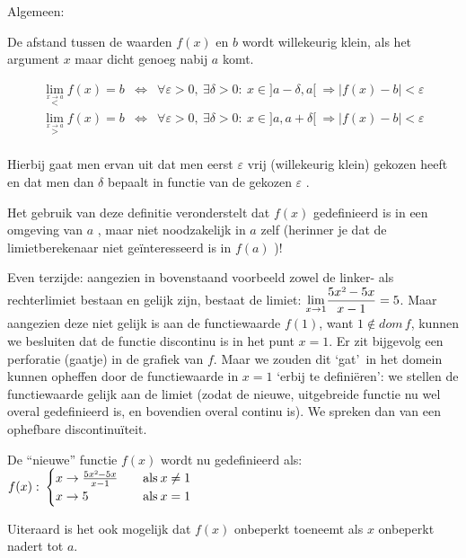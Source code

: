 Algemeen:

De afstand tussen de waarden $f(x)$ en $b$ wordt willekeurig klein,
als het argument $x$ maar dicht genoeg nabij $a$ komt.

\begin{eqnarray*}
{\displaystyle \lim_{\overset{x\rightarrow a}{<}}}f(x)=b & \Leftrightarrow & \forall\varepsilon>0,\:\exists\delta>0:\:x\in]a-\delta,a[\:\Rightarrow\left|f(x)-b\right|<\varepsilon\\
{\displaystyle \lim_{\overset{x\rightarrow a}{>}}}f(x)=b & \Leftrightarrow & \forall\varepsilon>0,\:\exists\delta>0:\:x\in]a,a+\delta[\:\Rightarrow\left|f(x)-b\right|<\varepsilon\\
\end{eqnarray*}

Hierbij gaat men ervan uit dat men eerst $\varepsilon$ vrij (willekeurig
klein) gekozen heeft en dat men dan $\delta$ bepaalt in functie van
de gekozen $\varepsilon$ .

Het gebruik van deze definitie veronderstelt dat $f(x)$ gedefinieerd
is in een omgeving van $a$ , maar niet noodzakelijk in $a$ zelf
(herinner je dat de limietberekenaar niet ge\"interesseerd is in $f(a)$
)! 

Even terzijde: aangezien in bovenstaand voorbeeld zowel
de linker- als rechterlimiet bestaan en gelijk zijn, bestaat de limiet:
${\displaystyle \lim_{x\to1}}{\displaystyle \frac{5x\text{\texttwosuperior}-5x}{x-1}}=5$.
Maar aangezien deze niet gelijk is aan de functiewaarde $f(1)$, want
$1\notin dom\,f$, kunnen we besluiten dat de functie discontinu is
in het punt $x=1$. Er zit bijgevolg een perforatie (gaatje) in de
grafiek van $f$. Maar we zouden dit \textquoteleft gat\textquoteright \ in het domein kunnen opheffen
door de functiewaarde in $x=1$ \textquoteleft erbij te defini\"eren\textquoteright: we stellen
de functiewaarde gelijk aan de limiet (zodat de nieuwe, uitgebreide
functie nu wel overal gedefinieerd is, en bovendien overal continu
is). We spreken dan van een ophefbare discontinu\"iteit.

De ``nieuwe'' functie $f(x)$ wordt nu gedefinieerd als:
$f(x):\:\begin{cases}
x\rightarrow\frac{5x\text{\texttwosuperior}-5x}{x-1} & \quad\mathrm{als}\:x\neq1\\
x\rightarrow5 & \quad\mathrm{als}\:x=1
\end{cases}$

Uiteraard is het ook mogelijk dat $f(x)$ onbeperkt toeneemt
als $x$ onbeperkt nadert tot $a$. 

